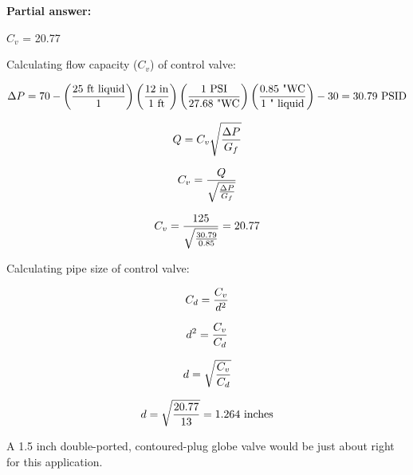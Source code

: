 





\noindent
{\bf Partial answer:}

\vskip 10pt

$C_{v}$ = 20.77
 






Calculating flow capacity ($C_v$) of control valve:

$$\Delta P = 70 - \left(25 \hbox{ ft liquid} \over 1 \right)  \left(12 \hbox{ in} \over 1 \hbox{ ft}\right)  \left(1 \hbox{ PSI} \over 27.68 \hbox{ "WC}\right)  \left(0.85 \hbox{ "WC} \over 1 \hbox{ " liquid}\right) - 30 = 30.79 \hbox{ PSID}$$

$$Q = C_v \sqrt{\Delta P \over G_f}$$

$$C_v = {Q \over \sqrt{\Delta P \over G_f}}$$

$$C_v = {125 \over \sqrt{30.79 \over 0.85}} = 20.77$$

\vskip 10pt

Calculating pipe size of control valve:

$$C_d = {C_v \over d^2}$$

$$d^2 = {C_v \over C_d}$$

$$d = \sqrt{C_v \over C_d}$$

$$d = \sqrt{20.77 \over 13} = 1.264 \hbox{ inches}$$


\vskip 10pt

A 1.5 inch double-ported, contoured-plug globe valve would be just about right for this application.




